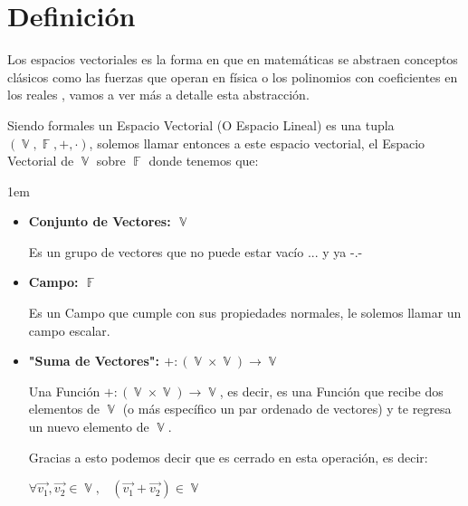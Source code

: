 \documentclass[12pt, fleqn]{report}                             %
\newenvironment{SmallIndentation}[1][0.75em]                    %
        {\begin{adjustwidth}{#1}{}\begin{footnotesize}}             %
        {\end{footnotesize}\end{adjustwidth}}                       %
\DeclareMathOperator \Space {\quad}                             %
\DeclareMathOperator \MiniSpace {\;}                            %
\theoremstyle{break}                                            %
\DeclareMathOperator \GenericField {\mathbb{F}}                 %
\DeclareMathOperator \VectorSet    {\mathbb{V}}                 %
\begin{document}
        \section{Definición}

            Los espacios vectoriales es la forma en que en matemáticas se abstraen conceptos clásicos como las
            fuerzas que operan en física o los polinomios con coeficientes en los reales , vamos a ver más a detalle
            esta abstracción.

            Siendo formales un Espacio Vectorial (O Espacio Lineal) es una tupla 
            $(\VectorSet, \GenericField, +, \cdot)$, solemos llamar entonces a este espacio vectorial, 
            el Espacio Vectorial de $\VectorSet$ sobre $\GenericField$ donde tenemos que:
            
            \begin{SmallIndentation}[1em]
                
                \begin{itemize}
                
                    \item
                        \textbf{Conjunto de Vectores: $\VectorSet$}

                        Es un grupo de vectores que no puede estar vacío ... y ya -.- 

                    \item
                        \textbf{Campo: $\GenericField$}

                        Es un Campo que cumple con sus propiedades normales, le solemos llamar un campo escalar.

                    \item
                        \textbf{"Suma de Vectores": $+: (\VectorSet \times  \VectorSet) \to \VectorSet$}

                        Una Función $+: (\VectorSet \times  \VectorSet) \to \VectorSet$, es decir, es una Función
                        que recibe dos elementos de $\VectorSet$ (o más específico un par ordenado de vectores) y te
                        regresa un nuevo elemento de $\VectorSet$.

                        Gracias a esto podemos decir que es cerrado en esta operación, es decir:

                        $\forall \vec{v_1}, \vec{v_2} \in \VectorSet,
                            \MiniSpace (\vec{v_1} + \vec{v_2}) \in \VectorSet$  



\end{itemize}
\end{SmallIndentation}
\end{document}
